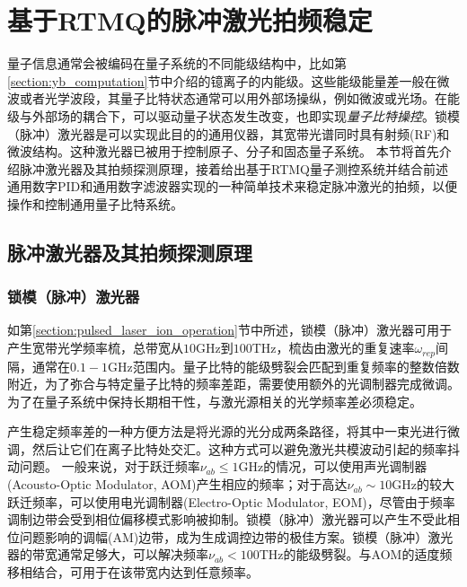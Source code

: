 \newpage
\section[基于RTMQ的脉冲激光拍频稳定]{基于RTMQ的脉冲激光拍频稳定\label{section:pulsed_laser_locking}}

量子信息通常会被编码在量子系统的不同能级结构中，比如第\ref{section:yb_computation}节中介绍的镱离子的内能级。这些能级能量差一般在微波或者光学波段，其量子比特状态通常可以用外部场操纵，例如微波或光场。在能级与外部场的耦合下，可以驱动量子状态发生改变，也即实现\emph{量子比特操控}。锁模（脉冲）激光器是可以实现此目的的通用仪器，其宽带光谱同时具有射频(RF)和微波结构。这种激光器已被用于控制原子\cite[]{Hayes_Matsukevich_Maunz_Hucul_Quraishi_Olmschenk_Campbell_Mizrahi_Senko_Monroe_2010}、分子\cite[]{Peer_Shapiro_Stowe_Shapiro_Ye_2007}和固态量子系统\cite[]{Greve_Press_McMahon_Yamamoto_2013}。
本节将首先介绍脉冲激光器及其拍频探测原理，接着给出基于RTMQ量子测控系统并结合前述通用数字PID和通用数字滤波器实现的一种简单技术来稳定脉冲激光的拍频，以便操作和控制通用量子比特系统\cite[]{ladd2010quantum}。


\subsection[脉冲激光器及其拍频探测原理]{脉冲激光器及其拍频探测原理}
\subsubsection[锁模（脉冲）激光器]{锁模（脉冲）激光器}
如第\ref{section:pulsed_laser_ion_operation}节中所述，锁模（脉冲）激光器可用于产生宽带光学频率梳，总带宽从$10$GHz到$100 $THz，梳齿由激光的重复速率$\omega_{rep}$间隔，通常在$0.1-1 $GHz范围内。量子比特的能级劈裂会匹配到重复频率的整数倍数附近，为了弥合与特定量子比特的频率差距，需要使用额外的光调制器完成微调\cite[]{Hayes_Matsukevich_Maunz_Hucul_Quraishi_Olmschenk_Campbell_Mizrahi_Senko_Monroe_2010}。为了在量子系统中保持长期相干性，与激光源相关的光学频率差必须稳定\cite[]{Stick_Hensinger_Olmschenk_Madsen_Schwab_Monroe_2006}。

产生稳定频率差的一种方便方法是将光源的光分成两条路径，将其中一束光进行微调，然后让它们在离子比特处交汇。这种方式可以避免激光共模波动引起的频率抖动问题\cite[]{Thomas_Hemmer_Ezekiel_Leiby_Picard_Willis_2002}。
一般来说，对于跃迁频率$\nu_{ab}\leq 1$GHz的情况，可以使用声光调制器(Acousto-Optic Modulator, AOM)产生相应的频率；对于高达$\nu_{ab} \sim 10 $GHz的较大跃迁频率，可以使用电光调制器(Electro-Optic Modulator, EOM)，尽管由于频率调制边带会受到相位偏移模式影响被抑制\cite[]{Lee_Blinov_Brickman_Deslauriers_Madsen_Miller_Moehring_Stick_Monroe_2003}。锁模（脉冲）激光器可以产生不受此相位问题影响的调幅(AM)边带，成为生成调控边带的极佳方案。锁模（脉冲）激光器的带宽通常足够大，可以解决频率$\nu_{ab} < 100 $THz的能级劈裂。与AOM的适度频移相结合，可用于在该带宽内达到任意频率。

